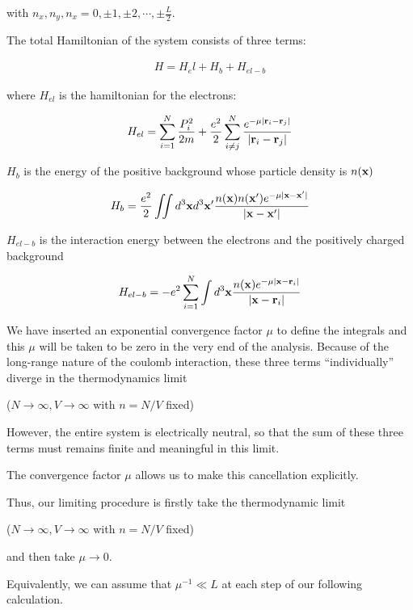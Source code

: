 with $n_x,n_y,n_x = 0,\pm1,\pm2,\cdots,\pm\frac{L}{2}$. 

The total Hamiltonian of the system consists of three terms:

\begin{align}
H = H_el+H_b+H_{el-b}
\end{align}

where $H_{el}$ is the hamiltonian for the electrons:

\begin{align}
H_{el} = \sum_{i=1}^N\frac{P_i^2}{2m}+\frac{e^2}{2}\sum_{i\neq j}^N\frac{e^{-\mu|{\bf r}_i - {\bf r}_j|}}{|{\bf r}_i - {\bf r}_j|}
\end{align}

$H_b$ is the energy of the positive background whose particle density is $n(\bf x)$

\begin{align}
H_b = \frac{e^2}{2}\iint d^3{\bf x}d^3{\bf x'}\frac{n({\bf x})n({\bf x'})e^{-\mu|\bf x-x'|}}{|\bf x-x'|}
\end{align}

$H_{el-b}$ is the interaction energy between the electrons and the positively charged background

\begin{align}
H_{el-b} = -e^2\sum_{i=1}^N\int d^3{\bf x}\frac{n({\bf x})e^{-\mu|{\bf x-r}_i|}}{|{\bf x - r}_i|}
\end{align}

We have inserted an exponential convergence factor $\mu$ to define the integrals and this $\mu$ will be taken to be zero in the very end of the analysis. Because of the long-range nature of the coulomb interaction, these three terms ``individually'' diverge in the thermodynamics limit

($N\rightarrow\infty, V\rightarrow\infty$ with $n = N/V$ fixed)

However, the entire system is electrically neutral, so that the sum of these three terms must remains finite and meaningful in this limit. 

The convergence factor $\mu$ allows us to make this cancellation explicitly. 

Thus, our limiting procedure is firstly take the thermodynamic limit 

($N\rightarrow\infty, V\rightarrow\infty$ with $n = N/V$ fixed)

and then take $\mu\rightarrow0$. 

Equivalently, we can assume that $\mu^{-1}\ll L$ at each step of our following calculation. 

